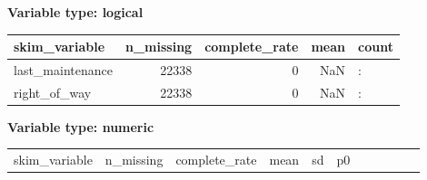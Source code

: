 \documentclass[
]{article}
\newcounter{none} %
\begin{document}
\textbf{Variable type: logical}

{\def\LTcaptype{none} %
\begin{longtable}[]{@{}lrrrl@{}}
\toprule\noalign{}
skim\_variable & n\_missing & complete\_rate & mean & count \\
\midrule\noalign{}
\endhead
\bottomrule\noalign{}
\endlastfoot
last\_maintenance & 22338 & 0 & NaN & : \\
right\_of\_way & 22338 & 0 & NaN & : \\
\end{longtable}
}

\textbf{Variable type: numeric}

{\def\LTcaptype{none} %
\begin{longtable}[]{@{}
  >{\raggedright\arraybackslash}p{}
  >{\raggedleft\arraybackslash}p{}
  >{\raggedleft\arraybackslash}p{}
  >{\raggedleft\arraybackslash}p{}
  >{\raggedleft\arraybackslash}p{}
  >{\raggedleft\arraybackslash}p{}
  >{\raggedleft\arraybackslash}p{}
  >{\raggedleft\arraybackslash}p{}
  >{\raggedleft\arraybackslash}p{}
  >{\raggedleft\arraybackslash}p{}
  >{\raggedright\arraybackslash}p{}@{}}
\toprule\noalign{}
\begin{minipage}[b]{\linewidth}\raggedright
skim\_variable
\end{minipage} & \begin{minipage}[b]{\linewidth}\raggedleft
n\_missing
\end{minipage} & \begin{minipage}[b]{\linewidth}\raggedleft
complete\_rate
\end{minipage} & \begin{minipage}[b]{\linewidth}\raggedleft
mean
\end{minipage} & \begin{minipage}[b]{\linewidth}\raggedleft
sd
\end{minipage} & \begin{minipage}[b]{\linewidth}\raggedleft
p0
\end{minipage} & \begin{minipage}[b]{\linewidth}\raggedleft

\end{minipage}
\end{longtable}}
\end{document}
